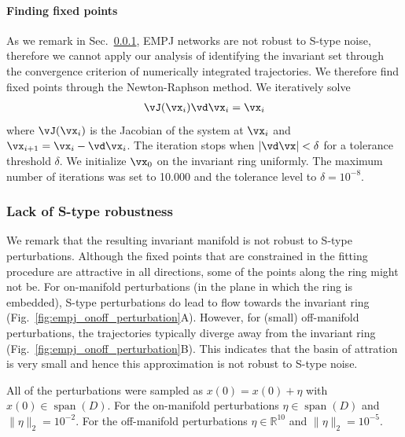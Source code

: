 \documentclass{article} %
\newcounter{ct}
\newcommand{\reals}{\mathbb{R}}
\theoremstyle{definition}
\theoremstyle{remark}
\begin{document}
\paragraph{Finding fixed points}
As we remark in Sec.~\ref{sec:empjnonrobust}, EMPJ networks are not robust to S-type noise, therefore we cannot apply our analysis of identifying the invariant set through the convergence criterion of numerically integrated trajectories.
We therefore find fixed points through the Newton-Raphson method.
We iteratively solve
\begin{align}
 \vJ(\vx_{i})\vd\vx_{i} = \vx_{i}
\end{align}
where \(\vJ(\vx_{i})\) is the Jacobian of the system at \(\vx_{i}\) and \(\vx_{i + 1}=\vx_{i}-\vd\vx_{i}\).
The iteration stops when \(|\vd\vx|<\delta\) for a tolerance threshold \(\delta\).
We initialize \(\vx_{0}\) on the invariant ring uniformly.
The maximum number of iterations was set to 10.000 and the tolerance level to \(\delta = 10^{-8}\).

\subsubsection{Lack of S-type robustness}\label{sec:empjnonrobust}
We remark that the resulting invariant manifold is not robust to S-type perturbations.
Although the fixed points that are constrained in the fitting procedure are attractive in all directions, some of the points along the ring might not be.
For on-manifold perturbations (in the plane in which the ring is embedded), S-type perturbations do lead to flow towards the invariant ring (Fig.~\ref{fig:empj_onoff_perturbation}A).
However, for (small) off-manifold perturbations, the trajectories typically diverge away from the invariant ring (Fig.~\ref{fig:empj_onoff_perturbation}B).
This indicates that the basin of attration is very small and hence this approximation is not robust to S-type noise.


All of the perturbations were sampled as
\(x(0) = x(0) + \eta\) with \(x(0)\in \operatorname{span}(D)\).
For the on-manifold perturbations \(\eta\in \operatorname{span}(D)\)  and \(\|\eta\|_{2} = 10^{-2}\).
For the off-manifold perturbations \(\eta\in \reals^{10}\) and \(\|\eta\|_{2} = 10^{-5}\).
\end{document}
